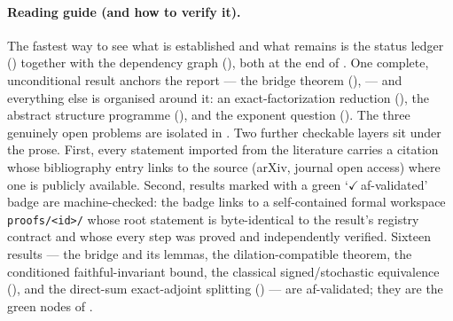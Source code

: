 \paragraph{Reading guide (and how to verify it).}
The fastest way to see what is established and what remains is the status ledger
() together with the dependency graph (), both at
the end of . One complete, unconditional result anchors the
report --- the bridge theorem (),  --- and
everything else is organised around it: an exact-factorization reduction
(), the abstract structure programme
(), and the exponent question (). The three
genuinely open problems are isolated in . Two further
checkable layers sit under the prose. First, every statement imported from the
literature carries a citation whose bibliography entry links to the source
(arXiv, journal open access) where one is publicly available. Second, results
marked with a green `\textcolor{afgreen}{$\checkmark$\,af-validated}' badge are
machine-checked: the badge links to a self-contained formal workspace
\texttt{proofs/<id>/} whose root statement is byte-identical to the result's
registry contract and whose every step was proved and independently verified.
Sixteen results --- the bridge and its lemmas, the dilation-compatible theorem,
the conditioned faithful-invariant bound, the classical signed/stochastic
equivalence (), and the direct-sum exact-adjoint
splitting () --- are af-validated; they are the
green nodes of .

